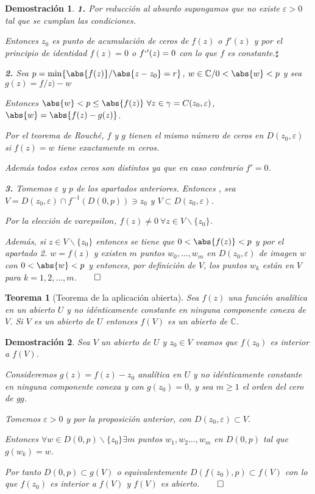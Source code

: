 \documentclass[12pt]{book}
\newtheorem{theorem}{Teorema}[chapter]
\newtheorem*{dem}{Demostración}
\newcommand{\C}{\mathbb{C}}
\begin{document}
\begin{dem}
\textbf{1.} Por reducción al absurdo supongamos que no existe $\varepsilon>0$ tal que se cumplan las condiciones.

Entonces $z_0$ es punto de acumulación de ceros de $f(z)$ o $f'(z)$ y por el principio de identidad $f(z)=0$ o $f`'(z)=0$ con lo que $f$ es constante.$\sharp$

\textbf{2.} Sea $p = \min\{\abs{f(z)}/ \abs{z-z_0}=r\}$, $w\in \C / 0<\abs{w}<p$ y sea $g(z) = f/z)-w$

Entonces $\abs{w} <p\leq \abs{f(z)}\ \forall z\in \gamma = C(z_0,\varepsilon)$, $\abs{w} = \abs{f(z)-g(z)}$.

Por el teorema de Rouché, $f$ y $g$ tienen el mismo número de ceros en $D(z_0,\varepsilon)$ si $f(z) = w$ tiene exactamente $m$ ceros.

Además todos estos ceros son distintos ya que en caso contrario $f'=0$.

\textbf{3.} Tomemos $\varepsilon$ y $p$ de los apartados anteriores.  Entonces , sea $V = D(z_0,\varepsilon)\cap f^{-1}(D(0,p))\ni z_0$ y $V\subset  D(z_0,\varepsilon)$.

Por la elección de $varepsilon$, $f(z) \neq 0\ \forall z\in V\backslash\{z_0\}$.

Además, si $z\in V\backslash\{z_0\}$ entonces se tiene que $0<\abs{f(z)}<p$ y por el apartado 2. $w=f(z)$ y existen $m$ puntos $w_0,\ldots,w_m$ en $D(z_0,\varepsilon)$ de imagen $w$ con $0<\abs{w}<p$ y entonces, por definición de $V$, los puntos $w_k$ están en $V$ para $k = 1,2,\ldots,m$.$\qed$
\end{dem}


\begin{theorem}[Teorema de la aplicación abierta]
Sea $f(z)$ una función analítica en un abierto $U$ y no idénticamente constante en ninguna componente conexa de $V$. Si $V$ es un abierto de $U$ entonces $f(V)$ es un abierto de $\C$.
\end{theorem}

\begin{dem}
Sea $V$ un abierto de $U$ y $z_0\in V$ veamos que $f(z_0)$ es interior a $f(V)$. 

Consideremos $g(z) = f(z) -z_0$ analítica en $U$ y no idénticamente constante en ninguna componente conexa y con $g(z_0) = 0$, y sea $m\geq 1$  el orden del cero de g$g$.

Tomemos $\varepsilon >0$ y por la proposición anterior, con $D(z_0,\varepsilon )\subset V$.

Entonces $\forall w \in D(0,p)\backslash \{z_0\} \exists m$ puntos  $w_1,w_2\ldots,w_m$ en $D(0,p)$ tal que $g(w_k)=w$.

Por tanto $D(0,p)\subset g(V)$ o equivalentemente $D(f(z_0),p) \subset f(V)$ con lo que $f(z_0)$ es interior a $f(V)$ y $f(V)$ es abierto.$\qed$
\end{dem}
\end{document}
